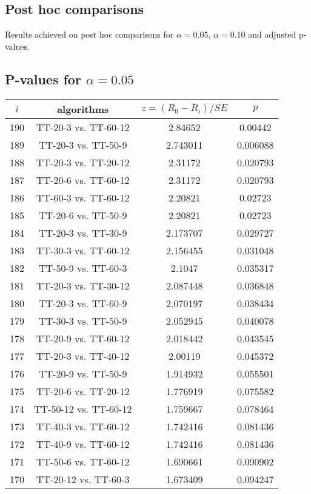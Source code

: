\documentclass[a4paper,10pt]{article}
\begin{document}
\begin{landscape}
\pagebreak

\section{Post hoc comparisons}

Results achieved on post hoc comparisons for $\alpha = 0.05$, $\alpha = 0.10$ and adjusted p-values.

\subsection{P-values for $\alpha=0.05$}

\begin{table}[!htp]
\centering\scriptsize
\begin{tabular}{cccc}
$i$&algorithms&$z=(R_0 - R_i)/SE$&$p$\\
\hline190&TT-20-3 vs. TT-60-12&2.84652&0.00442\\
189&TT-20-3 vs. TT-50-9&2.743011&0.006088\\
188&TT-20-3 vs. TT-20-12&2.31172&0.020793\\
187&TT-20-6 vs. TT-60-12&2.31172&0.020793\\
186&TT-60-3 vs. TT-60-12&2.20821&0.02723\\
185&TT-20-6 vs. TT-50-9&2.20821&0.02723\\
184&TT-20-3 vs. TT-30-9&2.173707&0.029727\\
183&TT-30-3 vs. TT-60-12&2.156455&0.031048\\
182&TT-50-9 vs. TT-60-3&2.1047&0.035317\\
181&TT-20-3 vs. TT-30-12&2.087448&0.036848\\
180&TT-20-3 vs. TT-60-9&2.070197&0.038434\\
179&TT-30-3 vs. TT-50-9&2.052945&0.040078\\
178&TT-20-9 vs. TT-60-12&2.018442&0.043545\\
177&TT-20-3 vs. TT-40-12&2.00119&0.045372\\
176&TT-20-9 vs. TT-50-9&1.914932&0.055501\\
175&TT-20-6 vs. TT-20-12&1.776919&0.075582\\
174&TT-50-12 vs. TT-60-12&1.759667&0.078464\\
173&TT-40-3 vs. TT-60-12&1.742416&0.081436\\
172&TT-40-9 vs. TT-60-12&1.742416&0.081436\\
171&TT-50-6 vs. TT-60-12&1.690661&0.090902\\
170&TT-20-12 vs. TT-60-3&1.673409&0.094247\\

\end{tabular}
\end{table}
\end{landscape}
\end{document}
